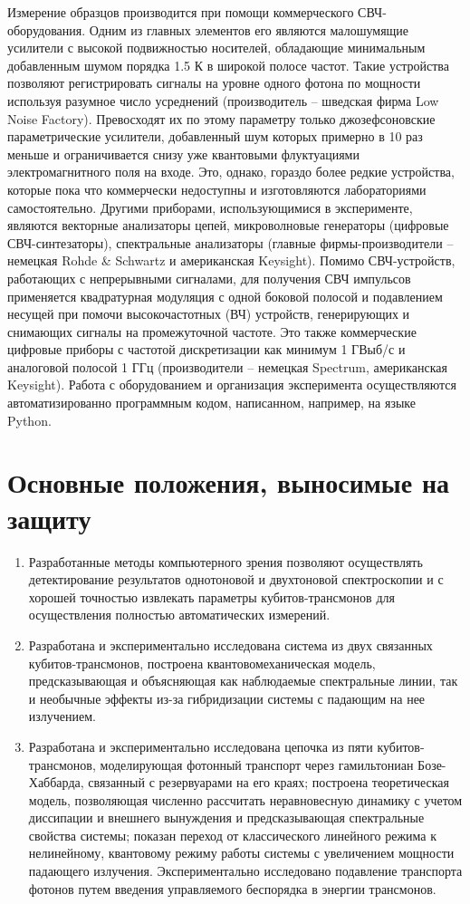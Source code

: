 \documentclass[14pt, a4paper]{extreport}
\numberwithin{equation}{section}
\begin{document}
Измерение образцов производится при помощи коммерческого СВЧ\hyp оборудования. Одним из главных элементов его являются малошумящие усилители с высокой подвижностью носителей, обладающие минимальным добавленным шумом порядка 1.5 К в широкой полосе частот. Такие устройства позволяют регистрировать сигналы на уровне одного фотона по мощности используя разумное число усреднений (производитель -- шведская фирма Low Noise Factory). Превосходят их по этому параметру только джозефсоновские параметрические усилители, добавленный шум которых примерно в 10 раз меньше и ограничивается снизу уже квантовыми флуктуациями электромагнитного поля на входе. Это, однако, гораздо более редкие устройства, которые пока что коммерчески недоступны и изготовляются лабораториями самостоятельно. Другими приборами, использующимися в эксперименте, являются векторные анализаторы цепей, микроволновые генераторы (цифровые СВЧ-синтезаторы), спектральные анализаторы (главные фирмы-производители -- немецкая Rohde \& Schwartz и американская Keysight). Помимо СВЧ-устройств, работающих с непрерывными сигналами, для получения СВЧ импульсов применяется квадратурная модуляция с одной боковой полосой и подавлением несущей при помочи высокочастотных (ВЧ) устройств, генерирующих и снимающих сигналы на промежуточной частоте. Это также коммерческие цифровые приборы с частотой дискретизации как минимум 1 ГВыб/с и аналоговой полосой 1 ГГц (производители -- немецкая Spectrum, американская Keysight). Работа с оборудованием и организация эксперимента осуществляются автоматизированно программным кодом, написанном, например, на языке Python.

\section*{Основные положения, выносимые на защиту}

\begin{enumerate}
	\item Разработанные методы компьютерного зрения позволяют осуществлять детектирование результатов однотоновой и двухтоновой спектроскопии и с хорошей точностью извлекать параметры кубитов-трансмонов для осуществления полностью автоматических измерений.
	\item Разработана и экспериментально исследована система из двух связанных кубитов\hyp трансмонов, построена квантовомеханическая модель, предсказывающая и объясняющая как наблюдаемые спектральные линии, так и необычные эффекты из-за гибридизации системы с падающим на нее излучением.
	\item Разработана и экспериментально исследована цепочка из пяти кубитов\hyp трансмонов, моделирующая фотонный транспорт через гамильтониан Бозе\hyp Хаббарда, связанный с резервуарами на его краях; построена теоретическая модель, позволяющая численно рассчитать неравновесную динамику с учетом диссипации и внешнего вынуждения и предсказывающая спектральные свойства системы; показан переход от классического линейного режима к нелинейному, квантовому режиму работы системы с увеличением мощности падающего излучения. Экспериментально исследовано подавление транспорта фотонов путем введения управляемого беспорядка в энергии трансмонов.
\end{enumerate}
	
\end{document}
